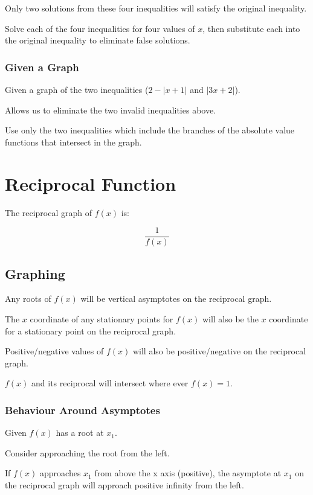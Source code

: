 \documentclass[a4paper,11pt]{article}
\begin{document}
Only two solutions from these four inequalities will satisfy the original
inequality.

Solve each of the four inequalities for four values of $x$, then substitute
each into the original inequality to eliminate false solutions.


\subsubsection{Given a Graph}

Given a graph of the two inequalities ($2 - \lvert x + 1 \rvert$ and
$\lvert 3x + 2 \rvert$).

Allows us to eliminate the two invalid inequalities above.

Use only the two inequalities which include the branches of the absolute value
functions that intersect in the graph.




\section{Reciprocal Function}

The reciprocal graph of $f(x)$ is:

$$
\frac{1}{f(x)}
$$


\subsection{Graphing}

Any roots of $f(x)$ will be vertical asymptotes on the reciprocal graph.

The $x$ coordinate of any stationary points for $f(x)$ will also be the $x$
coordinate for a stationary point on the reciprocal graph.

Positive/negative values of $f(x)$ will also be positive/negative on the
reciprocal graph.

$f(x)$ and its reciprocal will intersect where ever $f(x) = 1$.


\subsubsection{Behaviour Around Asymptotes}

Given $f(x)$ has a root at $x_1$.

Consider approaching the root from the left.

If $f(x)$ approaches $x_1$ from above the x axis (positive), the asymptote at
$x_1$ on the reciprocal graph will approach positive infinity from the left.
\end{document}
